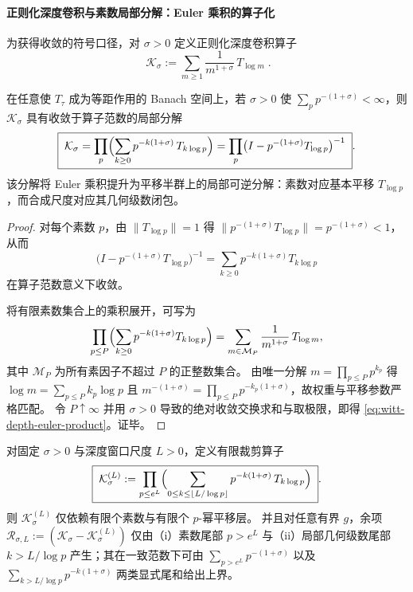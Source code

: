 \paragraph{正则化深度卷积与素数局部分解：Euler 乘积的算子化}
为获得收敛的符号口径，对 \(\sigma>0\) 定义正则化深度卷积算子
\begin{equation}\label{eq:witt-depth-regularized-operator}
\boxed{\;
\mathcal{K}_{\sigma}
:=\sum_{m\ge 1}\frac{1}{m^{1+\sigma}}\,T_{\log m}\; }.
\end{equation}

\begin{theorem}\label{thm:witt-depth-euler-product}
在任意使 \(T_{\tau}\) 成为等距作用的 Banach 空间上，若 \(\sigma>0\) 使 \(\sum_{p}p^{-(1+\sigma)}<\infty\)，则 \(\mathcal{K}_{\sigma}\) 具有收敛于算子范数的局部分解
\begin{equation}\label{eq:witt-depth-euler-product}
\boxed{\;
\mathcal{K}_{\sigma}
=\prod_{p}\Bigl(\sum_{k\ge 0}p^{-k(1+\sigma)}\,T_{k\log p}\Bigr)
=\prod_{p}\bigl(I-p^{-(1+\sigma)}T_{\log p}\bigr)^{-1}\; }.
\end{equation}
该分解将 Euler 乘积提升为平移半群上的局部可逆分解：素数对应基本平移 \(T_{\log p}\)，而合成尺度对应其几何级数闭包。
\end{theorem}
\begin{proof}
对每个素数 \(p\)，由 \(\|T_{\log p}\|=1\) 得 \(\|p^{-(1+\sigma)}T_{\log p}\|=p^{-(1+\sigma)}<1\)，从而
\[
\bigl(I-p^{-(1+\sigma)}T_{\log p}\bigr)^{-1}
=\sum_{k\ge 0}p^{-k(1+\sigma)}T_{k\log p}
\]
在算子范数意义下收敛。
\par
将有限素数集合上的乘积展开，可写为
\[
\prod_{p\le P}\Bigl(\sum_{k\ge 0}p^{-k(1+\sigma)}T_{k\log p}\Bigr)
=\sum_{m\in\mathcal{M}_P}\frac{1}{m^{1+\sigma}}\,T_{\log m},
\]
其中 \(\mathcal{M}_P\) 为所有素因子不超过 \(P\) 的正整数集合。
由唯一分解 \(m=\prod_{p\le P}p^{k_p}\) 得 \(\log m=\sum_{p\le P}k_p\log p\) 且 \(m^{-(1+\sigma)}=\prod_{p\le P}p^{-k_p(1+\sigma)}\)，故权重与平移参数严格匹配。
令 \(P\uparrow\infty\) 并用 \(\sigma>0\) 导致的绝对收敛交换求和与取极限，即得 \eqref{eq:witt-depth-euler-product}。证毕。
\end{proof}

\begin{corollary}\label{cor:witt-depth-finite-window-truncation}
对固定 \(\sigma>0\) 与深度窗口尺度 \(L>0\)，定义有限裁剪算子
\begin{equation}\label{eq:witt-depth-finite-window-trunc-operator}
\boxed{\;
\mathcal{K}_{\sigma}^{(L)}
:=\prod_{p\le e^{L}}
\Bigl(\sum_{0\le k\le \lfloor L/\log p\rfloor}p^{-k(1+\sigma)}\,T_{k\log p}\Bigr)\; }.
\end{equation}
则 \(\mathcal{K}_{\sigma}^{(L)}\) 仅依赖有限个素数与有限个 \(p\)-幂平移层。
并且对任意有界 \(g\)，余项
\(
\mathcal{R}_{\sigma,L}:=(\mathcal{K}_{\sigma}-\mathcal{K}_{\sigma}^{(L)})
\)
仅由（i）素数尾部 \(p>e^{L}\) 与（ii）局部几何级数尾部 \(k>L/\log p\) 产生；其在一致范数下可由
\(
\sum_{p>e^{L}}p^{-(1+\sigma)}
\)
以及
\(
\sum_{k> L/\log p}p^{-k(1+\sigma)}
\)
两类显式尾和给出上界。
\end{corollary}

